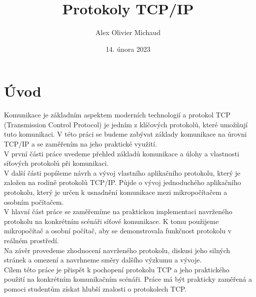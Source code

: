 \documentclass[12pt]{report}			%
\author{Alex Olivier Michaud}
\title{Protokoly TCP/IP}
\date{14. února 2023}
\begin{document}
	\mytitlepage						%
	
	
	
	
   {\tableofcontents\newpage}			%
	
\addtocounter{page}{1}		%
	\chapter*{Úvod}
	
	Komunikace je základním aspektem moderních technologií a protokol TCP (Transmission Control Protocol) je jedním z klíčových protokolů, které umožňují tuto komunikaci. V této práci se budeme zabývat základy komunikace na úrovni TCP/IP a se zaměřením na jeho praktické využití.
\\
V první části práce uvedeme přehled základů komunikace a úlohy a vlastnosti síťových protokolů při komunikaci.
\\
V další části popíšeme návrh a vývoj vlastního aplikačního protokolu, který je založen na rodině protokolů TCP/IP. Půjde o vývoj jednoduchého aplikačního protokolu, který je určen k usnadnění komunikace mezi mikropočítačem a osobním počítačem.
\\
V hlavní část práce se zaměřemíme na praktickou implementaci navrženého protokolu na konkrétním scénáři síťové komunikace. K tomu použijeme mikropočítač a osobní počítač, aby se demonstrovala funkčnost protokolu v reálném prostředí.
\\
Na závěr provedeme zhodnocení navrženého protokolu, diskusi jeho silných stránek a omezení a navrhneme směry dalšího výzkumu a vývoje.
\\
Cílem této práce je přispět k pochopení protokolu TCP a jeho praktického použití na konkrétním komunikačním scénáři. Práce má být prakticky zaměřená a pomoci studentům získat hlubší znalosti o protokolech TCP.	
	
\end{document}
